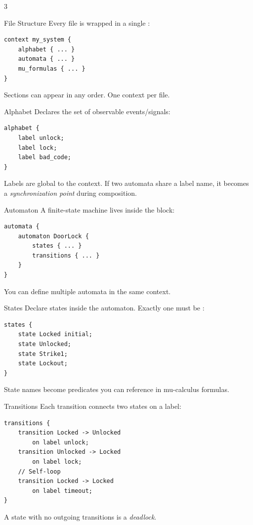 



\begin{multicols}{3}
\footnotesize


\begin{cheatbox}{File Structure}
Every  file is wrapped in a single :
\begin{lstlisting}[style=ctxdsl]
context my_system {
    alphabet { ... }
    automata { ... }
    mu_formulas { ... }
}
\end{lstlisting}
Sections can appear in any order.  One context per file.
\end{cheatbox}

\begin{cheatbox}{Alphabet}
Declares the set of observable events/signals:
\begin{lstlisting}[style=ctxdsl]
alphabet {
    label unlock;
    label lock;
    label bad_code;
}
\end{lstlisting}
Labels are global to the context.  If two automata share a label name, it becomes a \emph{synchronization point} during composition.
\end{cheatbox}

\begin{cheatbox}{Automaton}
A finite-state machine lives inside the  block:
\begin{lstlisting}[style=ctxdsl]
automata {
    automaton DoorLock {
        states { ... }
        transitions { ... }
    }
}
\end{lstlisting}
You can define multiple automata in the same context.
\end{cheatbox}


\begin{cheatbox}{States}
Declare states inside the automaton.  Exactly one must be :
\begin{lstlisting}[style=ctxdsl]
states {
    state Locked initial;
    state Unlocked;
    state Strike1;
    state Lockout;
}
\end{lstlisting}
State names become predicates you can reference in mu-calculus formulas.
\end{cheatbox}

\begin{cheatbox}{Transitions}
Each transition connects two states on a label:
\begin{lstlisting}[style=ctxdsl]
transitions {
    transition Locked -> Unlocked
        on label unlock;
    transition Unlocked -> Locked
        on label lock;
    // Self-loop
    transition Locked -> Locked
        on label timeout;
}
\end{lstlisting}
A state with no outgoing transitions is a \emph{deadlock}.
\end{cheatbox}


\end{multicols}
